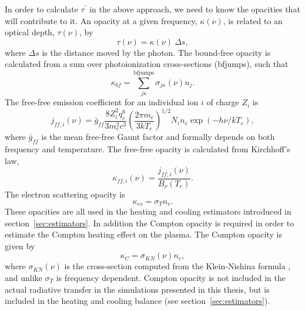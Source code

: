 In order to calculate $\tau^\prime$ in the above approach, we need
to know the opacities that will contribute to it. An opacity 
at a given frequency, $\kappa(\nu)$,
is related to an optical depth, $\tau(\nu)$, by
\begin{equation}
\tau(\nu) = \kappa(\nu)~\Delta s,
\end{equation}
where $\Delta s$ is the distance moved by the photon. The bound-free
opacity is calculated from a sum over photoionization cross-sections (bfjumps),
such that
\begin{equation}
\kappa_{bf} = \sum_{j\kappa}^{\mathrm{bfjumps}} \sigma_{j\kappa} (\nu) n_j.
\end{equation}
The free-free emission coefficient for an individual ion $i$ of charge $Z_i$ 
is \citep{gayet1970}
\begin{equation}
j_{ff,i} (\nu) = \bar{g}_{ff}\frac{8 Z_i^2 q_e^6}{3m_e^2 c^3}
\left( \frac{2\pi m_e}{3 k T_e} \right)^{1/2}
N_i n_e \exp(-h\nu/kT_e),
\label{eq:jff} 
\end{equation}
where $\bar{g}_{ff}$ is the mean free-free Gaunt factor and formally
depends on both frequency and temperature.
The free-free opacity is calculated from Kirchhoff's law, 
\begin{equation}
\kappa_{ff, i}(\nu) = \frac{j_{ff,i} (\nu)}{B_\nu (T_e)}.
\end{equation}
The electron scattering opacity is 
\begin{equation}
\kappa_{es} = \sigma_T n_e.
\end{equation}
These opacities are all used in the heating and cooling estimators 
introduced in section~\ref{sec:estimators}. In addition the
Compton opacity is required in order to estimate the Compton heating effect on the plasma.
The Compton opacity is given by
\begin{equation}
\kappa_{C} = \sigma_{KN} (\nu) n_e,
\end{equation}
where $\sigma_{KN} (\nu)$ is the cross-section computed 
from the Klein-Nishina formula \citep{klein-nishina}, and unlike $\sigma_T$
is frequency dependent. Compton opacity is not included in the actual radiative transfer 
in the simulations presented in this thesis, but is included in the heating and 
cooling balance (see section~\ref{sec:estimators}).

